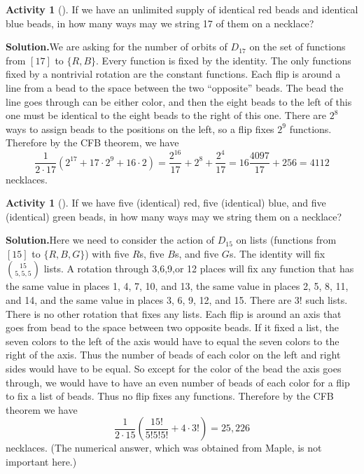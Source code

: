 \documentclass[10pt,]{book}
\theoremstyle{plain}
\theoremstyle{definition}
\newtheorem{activity}[project]{Activity}
\numberwithin{equation}{chapter}
\begin{document}
\begin{activity}[]\label{activity-311}
If we have an unlimited supply of identical red beads and identical blue beads, in how many ways may we string 17 of them on a necklace?%
\par\medskip\noindent%
\textbf{Solution.}\quad We are asking for the number of orbits of \(D_{17}\) on the set of functions from \([17]\) to \(\{R,B\}\). Every function is fixed by the identity. The only functions fixed by a nontrivial rotation are the constant functions. Each flip is around a line from a bead to the space between the two ``opposite'' beads. The bead the line goes through can be either color, and then the eight beads to the left of this one must be identical to the eight beads to the right of this one. There are \(2^8\) ways to assign beads to the positions on the left, so a flip fixes \(2^9\) functions. Therefore by the CFB theorem, we have%
\begin{equation*}
\frac{1}{2\cdot 17}\left(2^{17}+ 17\cdot2^9+16\cdot 2\right)=\frac{2^{16}}{17}+2^8 +\frac{2^4}{17}=16\frac{4097}{17}+256=4112
\end{equation*}
necklaces.%
\end{activity}
\begin{activity}[]\label{activity-312}
If we have five (identical) red, five (identical) blue, and five (identical) green beads, in how many ways may we string them on a necklace?%
\par\medskip\noindent%
\textbf{Solution.}\quad Here we need to consider the action of \(D_{15}\) on lists (functions from \([15]\) to \(\{R,B,G\}\)) with five \(R\)s, five \(B\)s, and five \(G\)s. The identity will fix \(\binom{15}{5,5,5}\) lists. A rotation through 3,6,9,or 12 places will fix any function that has the same value in places 1, 4, 7, 10, and 13, the same value in places 2, 5, 8, 11, and 14, and the same value in places 3, 6, 9, 12, and 15. There are \(3!\) such lists. There is no other rotation that fixes any lists. Each flip is around an axis that goes from bead to the space between two opposite beads. If it fixed a list, the seven colors to the left of the axis would have to equal the seven colors to the right of the axis. Thus the number of beads of each color on the left and right sides would have to be equal. So except for the color of the bead the axis goes through, we would have to have an even number of beads of each color for a flip to fix a list of beads. Thus no flip fixes any functions. Therefore by the CFB theorem we have%
\begin{equation*}
\frac{1}{2\cdot15}\left(\frac{15!}{5!5!5!} +4\cdot 3!\right)=25,226
\end{equation*}
necklaces. (The numerical answer, which was obtained from Maple, is not important here.)%
\end{activity}
\end{document}
